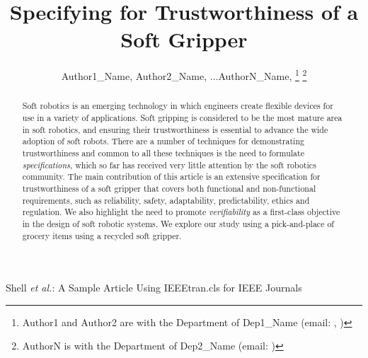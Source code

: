 \documentclass[lettersize,journal]{IEEEtran}
\begin{document}
\title{Specifying for Trustworthiness of a Soft Gripper}

\author{Author1\_Name, Author2\_Name, ...AuthorN\_Name,
	\thanks{Author1 and Author2 are with the Department of Dep1\_Name (email: , )}
	\thanks{AuthorN is with the Department of Dep2\_Name (email: )}}
%
{Shell \MakeLowercase{\textit{et al.}}: A Sample Article Using IEEEtran.cls for IEEE Journals}




\maketitle

\begin{abstract}
Soft robotics is an emerging technology in which engineers create flexible devices for use in a variety of applications. %
Soft gripping is considered to be the most mature area in soft robotics, and ensuring their trustworthiness is essential to advance the wide adoption of soft robots. 
There are a number of techniques for demonstrating trustworthiness and common to all these techniques is the need to formulate \emph{specifications}, which so far has received very little attention by the soft robotics community.
The main contribution of this article is an extensive specification for trustworthiness of a soft gripper that covers both functional and non-functional requirements, such as reliability, safety, adaptability, predictability, ethics and regulation.  
We also highlight the need to promote \emph{verifiability} as a first-class objective in the design of soft robotic systems. 
We explore our study using a pick-and-place of grocery items using a recycled soft gripper.
\end{abstract}
\end{document}
